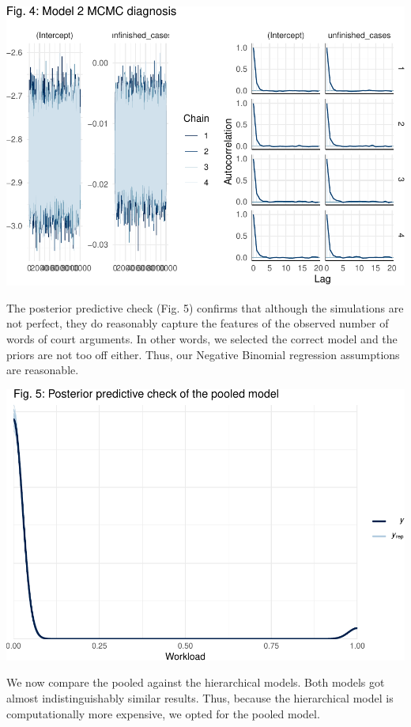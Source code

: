 \documentclass[
  11pt,
]{article}
\begin{document}
\includegraphics{dissents_article_appendix_files/figure-latex/mcmc_diagnosis_workload-1.pdf}
\vspace{25pt}

The posterior predictive check (Fig. 5) confirms that although the
simulations are not perfect, they do reasonably capture the features of
the observed number of words of court arguments. In other words, we
selected the correct model and the priors are not too off either. Thus,
our Negative Binomial regression assumptions are reasonable.

\vspace{25pt}

\includegraphics{dissents_article_appendix_files/figure-latex/pp_check_workload-1.pdf}
\vspace{25pt}

We now compare the pooled against the hierarchical models. Both models
got almost indistinguishably similar results. Thus, because the
hierarchical model is computationally more expensive, we opted for the
pooled model.
\end{document}
